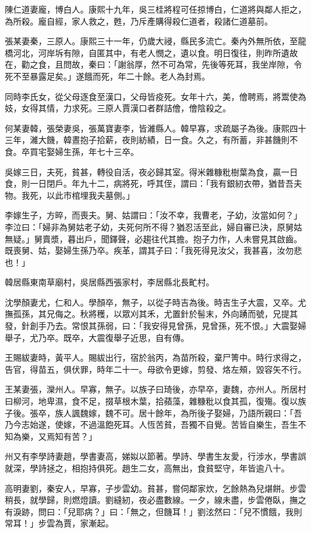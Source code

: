 \begin{pinyinscope}
陳仁道妻龐，博白人。康熙十九年，吳三桂將程可任掠博白，仁道將與鄰人拒之，為所殺。龐自經，家人救之，甦，乃斥產購得殺仁道者，殺諸仁道墓前。

張某妻秦，三原人。康熙三十一年，仍歲大祲，縣民多流亡。秦內外無所依，至龍橋河北，河岸坼有隙，自匿其中，有老人憫之，遺以食。明日復往，則昨所遺故在，勸之食，且問故，秦曰：「謝翁厚，然不可為常，先後等死耳，我坐岸隙，令死不至暴露足矣。」遂餓而死，年二十餘。老人為封焉。

同時李氏女，從父母逐食至漢口，父母皆疫死。女年十六，美，儈聘焉，將鬻使為妓，女得其情，力求死。三原人賈漢口者群詰儈，儈陰殺之。

何某妻韓，張榮妻吳，張萬寶妻李，皆濰縣人。韓早寡，求疏屬子為後。康熙四十三年，濰大饑，韓晝抱子拾薪，夜則紡績，日一食。久之，有所蓄，非甚饑則不食。卒買宅娶婦生孫，年七十三卒。

吳嫁三日，夫死，貧甚，轉役自活，夜必歸其室。得米雜糠粃樹葉為食，贏一日食，則一日閉戶。年九十二，病將死，呼其侄，謂曰：「我有銀紉衣帶，猶昔吾夫物。我死，以此市棺埋我夫墓側。」

李嫁生子，方晬，而喪夫。舅、姑謂曰：「汝不幸，我曹老，子幼，汝當如何？」李泣曰：「婦非為舅姑老子幼，夫死何所不得？猶忍活至此，婦自審已決，原舅姑無疑。」舅賣漿，暮出戶，聞鐸聲，必趨往代其擔。抱子力作，人未嘗見其啟齒。既喪舅、姑，娶婦生孫乃卒。疾革，謂其子曰：「我死得見汝父，我甚喜，汝勿悲也！」

韓居縣東南草廟村，吳居縣西張家村，李居縣北長甿村。

沈學顏妻尤，仁和人。學顏卒，無子，以從子時吉為後。時吉生子大震，又卒。尤撫孤孫，其兄侮之。秋將穫，以眾刈其禾，尤置針於髻末，外向踴而號，兄提其發，針創手乃去。常恨其孫弱，曰：「我安得見曾孫，見曾孫，死不恨。」大震娶婦舉子，尤乃卒。既卒，大震復舉子近思，自有傳。

王賜紱妻時，黃平人。賜紱出行，宿於翁丙，為苗所殺，棄尸箐中。時行求得之，告官，得苗五，俱伏罪，時年二十一。母欲令更嫁，剪發、烙左頰，毀容矢不行。

王某妻張，灤州人。早寡，無子。以族子曰琦後，亦早卒，妻魏，亦州人。所居村曰柳河，地卑濕，食不足，掇草根木葉，拾蘋藻，雜糠粃以食其孤，復殤。復以族子後。張卒，族人諷魏嫁，魏不可。居十餘年，為所後子娶婦，乃語所親曰：「吾乃今志始遂，使嫁，不過溫飽死耳。人恆苦貧，吾獨不自覺。苦皆自樂生，吾生不知為樂，又焉知有苦？」

州又有李學詩妻趙，學書妻高，娣姒以節著。學詩、學書生友愛，行涉水，學書誤就深，學詩拯之，相抱持俱死。趙生二女，高無出，食貧堅守，年皆逾八十。

高明妻劉，秦安人，早寡，子步雲幼。貧甚，嘗伺鄰家炊，乞餘熱為兒煁餅。步雲稍長，就學歸，則燃燈讀。劉縫紉，夜必盡數線。一夕，線未盡，步雲倦臥，撫之有淚跡，問曰：「兒耶病？」曰：「無之，但饑耳！」劉泫然曰：「兒不慣餓，我則常耳！」步雲為賈，家漸起。


\end{pinyinscope}
